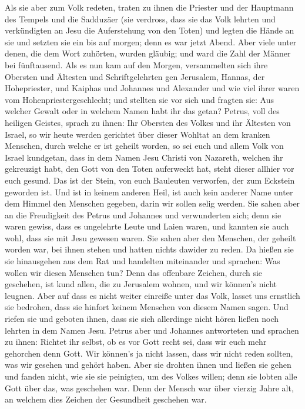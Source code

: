  Als sie aber zum Volk redeten, traten zu ihnen die
Priester und der Hauptmann des Tempels und die Sadduzäer 
(sie verdross, dass sie das Volk lehrten und verkündigten an Jesu die
Auferstehung von den Toten)  und legten die Hände an sie
und setzten sie ein bis auf morgen; denn es war jetzt Abend.
 Aber viele unter denen, die dem Wort zuhörten, wurden
gläubig; und ward die Zahl der Männer bei fünftausend. 
Als es nun kam auf den Morgen, versammelten sich ihre Obersten und
Ältesten und Schriftgelehrten gen Jerusalem,  Hannas, der
Hohepriester, und Kaiphas und Johannes und Alexander und wie viel ihrer
waren vom Hohenpriestergeschlecht;  und stellten sie vor
sich und fragten sie: Aus welcher Gewalt oder in welchem Namen habt ihr
das getan?  Petrus, voll des heiligen Geistes, sprach zu
ihnen: Ihr Obersten des Volkes und ihr Ältesten von Israel,
 so wir heute werden gerichtet über dieser Wohltat an dem
kranken Menschen, durch welche er ist geheilt worden,  so
sei euch und allem Volk von Israel kundgetan, dass in dem Namen Jesu
Christi von Nazareth, welchen ihr gekreuzigt habt, den Gott von den
Toten auferweckt hat, steht dieser allhier vor euch gesund.
 Das ist der Stein, von euch Bauleuten verworfen, der zum
Eckstein geworden ist.  Und ist in keinem anderen Heil,
ist auch kein anderer Name unter dem Himmel den Menschen gegeben, darin
wir sollen selig werden.  Sie sahen aber an die
Freudigkeit des Petrus und Johannes und verwunderten sich; denn sie
waren gewiss, dass es ungelehrte Leute und Laien waren, und kannten sie
auch wohl, dass sie mit Jesu gewesen waren.  Sie sahen
aber den Menschen, der geheilt worden war, bei ihnen stehen und hatten
nichts dawider zu reden.  Da hießen sie sie hinausgehen
aus dem Rat und handelten miteinander und sprachen:  Was
wollen wir diesen Menschen tun? Denn das offenbare Zeichen, durch sie
geschehen, ist kund allen, die zu Jerusalem wohnen, und wir können's
nicht leugnen.  Aber auf dass es nicht weiter einreiße
unter das Volk, lasset uns ernstlich sie bedrohen, dass sie hinfort
keinem Menschen von diesem Namen sagen.  Und riefen sie
und geboten ihnen, dass sie sich allerdinge nicht hören ließen noch
lehrten in dem Namen Jesu.  Petrus aber und Johannes
antworteten und sprachen zu ihnen: Richtet ihr selbst, ob es vor Gott
recht sei, dass wir euch mehr gehorchen denn Gott.  Wir
können's ja nicht lassen, dass wir nicht reden sollten, was wir gesehen
und gehört haben.  Aber sie drohten ihnen und ließen sie
gehen und fanden nicht, wie sie sie peinigten, um des Volkes willen;
denn sie lobten alle Gott über das, was geschehen war. 
Denn der Mensch war über vierzig Jahre alt, an welchem dies Zeichen der
Gesundheit geschehen war.

